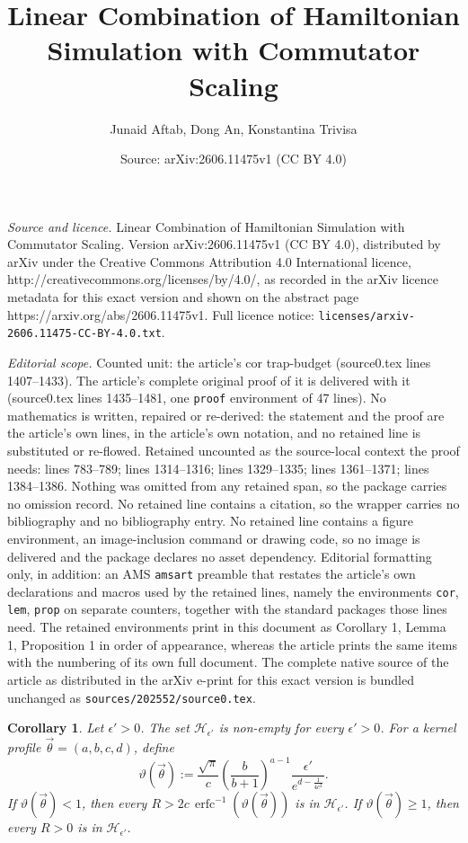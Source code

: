\documentclass[10pt,a4paper]{amsart}
\title{Linear Combination of Hamiltonian Simulation with Commutator Scaling}
\author{Junaid Aftab, Dong An, Konstantina Trivisa}
\date{Source: arXiv:2606.11475v1 (CC BY 4.0)}
\newtheorem{cor}{Corollary}
\begin{document}
\maketitle

\noindent\emph{Source and licence.} Linear Combination of Hamiltonian Simulation with Commutator Scaling. Version arXiv:2606.11475v1 (CC BY 4.0), distributed by arXiv under the Creative Commons Attribution 4.0 International licence, http://creativecommons.org/licenses/by/4.0/, as recorded in the arXiv licence metadata for this exact version and shown on the abstract page https://arxiv.org/abs/2606.11475v1. Full licence notice: \texttt{licenses/arxiv-2606.11475-CC-BY-4.0.txt}.\par\smallskip

\noindent\textit{Editorial scope.} Counted unit: the article's cor trap-budget (source0.tex lines 1407--1433). The article's complete original proof of it is delivered with it (source0.tex lines 1435--1481, one \texttt{proof} environment of 47 lines). No mathematics is written, repaired or re-derived: the statement and the proof are the article's own lines, in the article's own notation, and no retained line is substituted or re-flowed.  Retained uncounted as the source-local context the proof needs: lines 783--789; lines 1314--1316; lines 1329--1335; lines 1361--1371; lines 1384--1386.  Nothing was omitted from any retained span, so the package carries no omission record.  No retained line contains a citation, so the wrapper carries no bibliography and no bibliography entry.  No retained line contains a figure environment, an image-inclusion command or drawing code, so no image is delivered and the package declares no asset dependency.  Editorial formatting only, in addition: an AMS \texttt{amsart} preamble that restates the article's own declarations and macros used by the retained lines, namely the environments \texttt{cor}, \texttt{lem}, \texttt{prop} on separate counters, together with the standard packages those lines need.  The retained environments print in this document as Corollary 1, Lemma 1, Proposition 1 in order of appearance, whereas the article prints the same items with the numbering of its own full document.  The complete native source of the article as distributed in the arXiv e-print for this exact version is bundled unchanged as \texttt{sources/202552/source0.tex}.
\begin{cor}\label{radii-lower-bd}
Let \(\epsilon'>0\). The set \(\mathcal H_{\epsilon'}\) is non-empty for every \(\epsilon'>0\). For a kernel profile \(\vec{\theta}=(a,b,c,d)\), define
\begin{equation}
\vartheta(\vec\theta) := \frac{\sqrt{\pi}}{c}\left(\frac{b}{b+1}\right)^{a-1}\frac{\epsilon'}{e^{d-\frac{1}{4c^2}}}.
\end{equation}
If \(\vartheta(\vec\theta)<1\), then every \(R>2c\,\operatorname{erfc}^{-1}(\vartheta(\vec\theta))\) is in \(\mathcal H_{\epsilon'}\). If \(\vartheta(\vec\theta)\ge 1\), then every \(R>0\) is in \(\mathcal H_{\epsilon'}\).
\end{cor}
\end{document}
